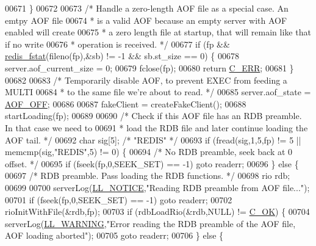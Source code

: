 \begin{DoxyCode}
{{{{{{{{{{00671     \}
00672 
00673     \textcolor{comment}{/* Handle a zero-length AOF file as a special case. An emtpy AOF file}
00674 \textcolor{comment}{     * is a valid AOF because an empty server with AOF enabled will create}
00675 \textcolor{comment}{     * a zero length file at startup, that will remain like that if no write}
00676 \textcolor{comment}{     * operation is received. */}
00677     \textcolor{keywordflow}{if} (fp && \hyperlink{config_8h_a7fb7329d05a6b4d1b1e7a3fac44c0668}{redis\_fstat}(fileno(fp),&sb) != -1 && sb.st\_size == 0) \{
00678         server.aof\_current\_size = 0;
00679         fclose(fp);
00680         \textcolor{keywordflow}{return} \hyperlink{server_8h_af98ac28d5f4d23d7ed5985188e6fb7d1}{C\_ERR};
00681     \}
00682 
00683     \textcolor{comment}{/* Temporarily disable AOF, to prevent EXEC from feeding a MULTI}
00684 \textcolor{comment}{     * to the same file we're about to read. */}
00685     server.aof\_state = \hyperlink{server_8h_a5226306fbcebcb6d5d02e0fef3c213c2}{AOF\_OFF};
00686 
00687     fakeClient = createFakeClient();
00688     startLoading(fp);
00689 
00690     \textcolor{comment}{/* Check if this AOF file has an RDB preamble. In that case we need to}
00691 \textcolor{comment}{     * load the RDB file and later continue loading the AOF tail. */}
00692     \textcolor{keywordtype}{char} sig[5]; \textcolor{comment}{/* "REDIS" */}
00693     \textcolor{keywordflow}{if} (fread(sig,1,5,fp) != 5 || memcmp(sig,\textcolor{stringliteral}{"REDIS"},5) != 0) \{
00694         \textcolor{comment}{/* No RDB preamble, seek back at 0 offset. */}
00695         \textcolor{keywordflow}{if} (fseek(fp,0,SEEK\_SET) == -1) \textcolor{keywordflow}{goto} readerr;
00696     \} \textcolor{keywordflow}{else} \{
00697         \textcolor{comment}{/* RDB preamble. Pass loading the RDB functions. */}
00698         rio rdb;
00699 
00700         serverLog(\hyperlink{server_8h_a8c54c191e436c7dd3012167212692401}{LL\_NOTICE},\textcolor{stringliteral}{"Reading RDB preamble from AOF file..."});
00701         \textcolor{keywordflow}{if} (fseek(fp,0,SEEK\_SET) == -1) \textcolor{keywordflow}{goto} readerr;
00702         rioInitWithFile(&rdb,fp);
00703         \textcolor{keywordflow}{if} (rdbLoadRio(&rdb,NULL) != \hyperlink{server_8h_a303769ef1065076e68731584e758d3e1}{C\_OK}) \{
00704             serverLog(\hyperlink{server_8h_a31229b9334bba7d6be2a72970967a14b}{LL\_WARNING},\textcolor{stringliteral}{"Error reading the RDB preamble of the AOF file, AOF
       loading aborted"});
00705             \textcolor{keywordflow}{goto} readerr;
00706         \} \textcolor{keywordflow}{else} \{
}}}}}}}}}}
\end{DoxyCode}
